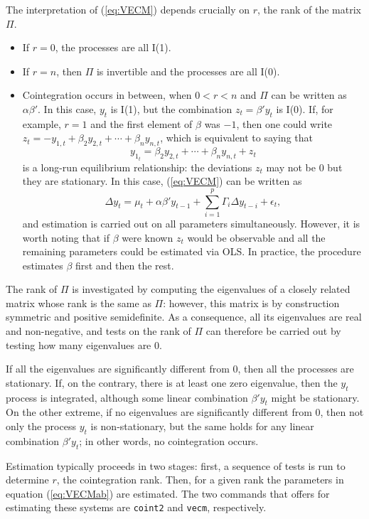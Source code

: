 The interpretation of (\ref{eq:VECM}) depends crucially on $r$, the rank of
the matrix $\Pi$.
\begin{itemize}
\item If $r = 0$, the processes are all I(1).
\item If $r = n$, then $\Pi$ is invertible and the processes are all I(0).
\item Cointegration occurs in between, when $0 < r < n$ and $\Pi$ can
  be written as $\alpha \beta'$. In this case, $y_t$ is I(1), but the
  combination $z_t = \beta'y_t$ is I(0). If, for example, $r=1$ and
  the first element of $\beta$ was $-1$, then one could write $z_t =
  -y_{1,t} + \beta_2 y_{2,t} + \cdots + \beta_n y_{n,t}$, which is
  equivalent to saying that
  \[
    y_{1_t} = \beta_2 y_{2,t} + \cdots + \beta_n y_{n,t} + z_t
  \]
  is a long-run equilibrium relationship: the deviations $z_t$
  may not be 0 but they are stationary. In this case, (\ref{eq:VECM})
  can be written as 
  \begin{equation}
    \label{eq:VECMab}
    \Delta y_t = \mu_t + \alpha \beta' y_{t-1} + \sum_{i=1}^p \Gamma_i 
    \Delta y_{t-i} + \epsilon_t ,
  \end{equation}
  and estimation is carried out on all parameters
  simultaneously. However, it is worth noting that if $\beta$ were
  known $z_t$ would be observable and all the remaining parameters
  could be estimated via OLS. In practice, the procedure estimates
  $\beta$ first and then the rest.
\end{itemize}

The rank of $\Pi$ is investigated by computing the eigenvalues of a
closely related matrix whose rank is the same as $\Pi$: however, this
matrix is by construction symmetric and positive semidefinite.  As a
consequence, all its eigenvalues are real and non-negative, and tests
on the rank of $\Pi$ can therefore be carried out by testing how many
eigenvalues are 0.

If all the eigenvalues are significantly different from 0, then all
the processes are stationary. If, on the contrary, there is at least
one zero eigenvalue, then the $y_t$ process is integrated, although
some linear combination $\beta'y_t$ might be stationary. On the other
extreme, if no eigenvalues are significantly different from 0, then
not only the process $y_t$ is non-stationary, but the same holds for
any linear combination $\beta'y_t$; in other words, no cointegration
occurs.

Estimation typically proceeds in two stages: first, a sequence of
tests is run to determine $r$, the cointegration rank. Then, for a
given rank the parameters in equation (\ref{eq:VECMab}) are estimated.
The two commands that  offers for estimating these systems
are \texttt{coint2} and \texttt{vecm}, respectively. 

